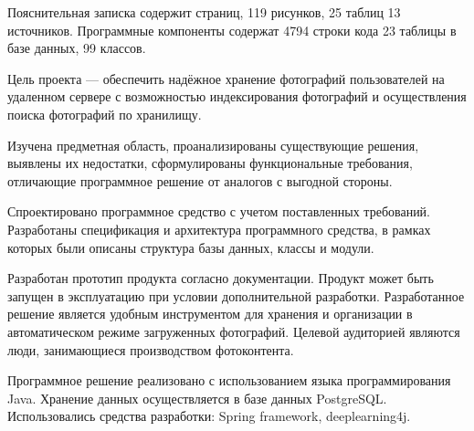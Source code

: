 
Пояснительная записка содержит \pageref{LastPage} страниц, 119 рисунков, 25 таблиц 13 источников.
Программные компоненты содержат 4794 строки кода 23 таблицы в базе данных, 99 классов.

Цель проекта — обеспечить надёжное хранение фотографий пользователей на удаленном сервере с возможностью индексирования фотографий и осуществления поиска фотографий по хранилищу. 

Изучена предметная область, проанализированы существующие решения, выявлены их недостатки, сформулированы функциональные требования, отличающие программное решение от аналогов с выгодной стороны.

Спроектировано программное средство с учетом поставленных требований.
Разработаны спецификация и архитектура программного средства, в рамках которых были описаны структура базы данных, классы и модули.

Разработан прототип продукта согласно документации. 
Продукт может быть запущен в эксплуатацию при условии дополнительной разработки.
Разработанное решение является удобным инструментом для хранения и организации в автоматическом режиме загруженных фотографий.
Целевой аудиторией являются люди, занимающиеся производством фотоконтента.

Программное решение реализовано с использованием языка программирования Java. Хранение данных осуществляется в базе данных PostgreSQL. Использовались средства разработки: Spring framework, deeplearning4j.

\clearpage